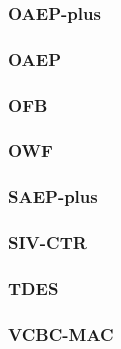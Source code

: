 \begin{frame}\frametitle{OAEP-plus}
\begin{figure}
\begin{center}

\end{center}
\end{figure}
\end{frame}
\begin{frame}\frametitle{OAEP}
\begin{figure}
\begin{center}

\end{center}
\end{figure}
\end{frame}
\begin{frame}\frametitle{OFB}
\begin{figure}
\begin{center}

\end{center}
\end{figure}
\end{frame}
\begin{frame}\frametitle{OWF}
\begin{figure}
\begin{center}

\end{center}
\end{figure}
\end{frame}
\begin{frame}\frametitle{SAEP-plus}
\begin{figure}
\begin{center}

\end{center}
\end{figure}
\end{frame}
\begin{frame}\frametitle{SIV-CTR}
\begin{figure}
\begin{center}

\end{center}
\end{figure}
\end{frame}
\begin{frame}\frametitle{TDES}
\begin{figure}
\begin{center}

\end{center}
\end{figure}
\end{frame}
\begin{frame}\frametitle{VCBC-MAC}
\begin{figure}
\begin{center}

\end{center}
\end{figure}
\end{frame}
